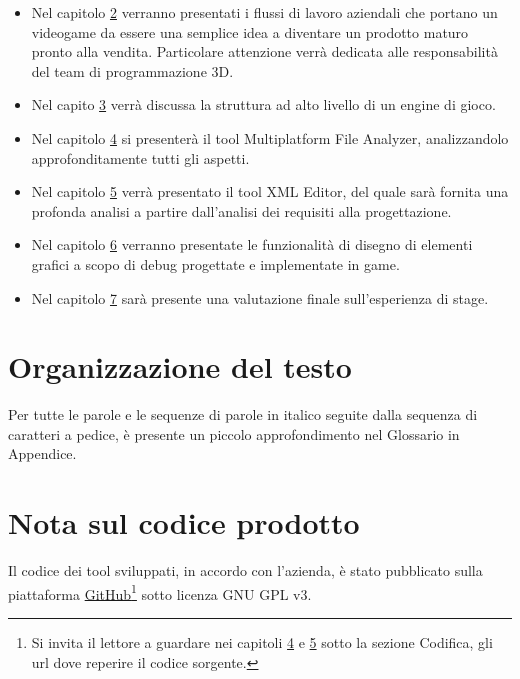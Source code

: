 \begin{itemize}
	\item Nel capitolo \hyperref[cap:milestone]{2} verranno presentati i flussi di lavoro aziendali che portano un videogame da essere una semplice idea a diventare un prodotto maturo pronto alla vendita. Particolare attenzione verrà dedicata alle responsabilità del team di programmazione 3D.
	
	\item Nel capito \hyperref[cap:engine-di-gioco]{3} verrà discussa la struttura ad alto livello di un engine di gioco.
	
	\item Nel capitolo \hyperref[cap:multiplatform-file-analyzer]{4} si presenterà il tool Multiplatform File Analyzer, analizzandolo approfonditamente tutti gli aspetti.
	
	\item Nel capitolo \hyperref[cap:xml-editor]{5} verrà presentato il tool XML Editor, del quale sarà fornita una profonda analisi a partire dall'analisi dei requisiti alla progettazione.
	
	\item Nel capitolo \hyperref[cap:game]{6} verranno presentate le funzionalità di disegno di elementi grafici a scopo di debug progettate e implementate in game.
	
	\item Nel capitolo \hyperref[cap:conclusioni]{7} sarà presente una valutazione finale sull'esperienza di stage.
\end{itemize}

\section{Organizzazione del testo}

Per tutte le parole e le sequenze di parole in italico seguite dalla sequenza di caratteri  a pedice, è presente un piccolo approfondimento nel Glossario in Appendice.

\section{Nota sul codice prodotto}

Il codice dei tool sviluppati, in accordo con l'azienda, è stato pubblicato sulla piattaforma \hyperref{https://github.com/}{}{}{GitHub}\footnote{Si invita il lettore a guardare nei capitoli \hyperref[cap:multiplatform-file-analyzer]{4} e \hyperref[cap:xml-editor]{5} sotto la sezione Codifica, gli url dove reperire il codice sorgente.} sotto licenza GNU GPL v3.\\

